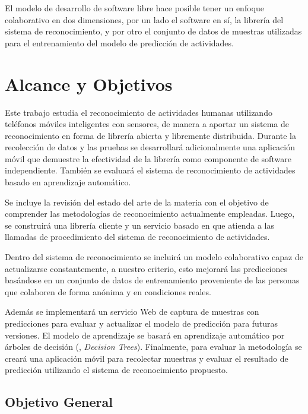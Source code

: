 El modelo de desarrollo de software libre hace posible tener un enfoque
colaborativo en dos dimensiones, por un lado el software en sí, la
librería del sistema de reconocimiento, y por otro el conjunto de
datos de muestras utilizadas para el entrenamiento del modelo de predicción
de actividades.

\section{Alcance y Objetivos}

\label{alcance-y-objetivos}

Este trabajo estudia el reconocimiento de actividades humanas utilizando
teléfonos móviles inteligentes con sensores, de manera a aportar un
sistema de reconocimiento en forma de librería abierta y libremente
distribuida. Durante la recolección de datos y las pruebas se desarrollará
adicionalmente una aplicación móvil que demuestre la efectividad de
la librería como componente de software independiente. También se
evaluará el sistema de reconocimiento de actividades basado en aprendizaje
automático.

Se incluye la revisión del estado del arte de la materia con el objetivo
de comprender las metodologías de reconocimiento actualmente empleadas.
Luego, se construirá una librería cliente y un servicio basado en
\emph{} que atienda a las llamadas de procedimiento
del sistema de reconocimiento de actividades. 

Dentro del sistema de reconocimiento se incluirá un modelo colaborativo
capaz de actualizarse constantemente, a nuestro criterio, esto mejorará
las predicciones basándose en un conjunto de datos de entrenamiento
proveniente de las personas que colaboren de forma anónima y en condiciones
reales.

Además se implementará un servicio Web de captura de muestras con
predicciones para evaluar y actualizar el modelo de predicción para
futuras versiones. El modelo de aprendizaje se basará en aprendizaje
automático por árboles de decisión (, \emph{Decision Trees}).
Finalmente, para evaluar la metodología se creará una aplicación móvil
para recolectar muestras y evaluar el resultado de predicción utilizando
el sistema de reconocimiento propuesto.

\subsection{Objetivo General}

